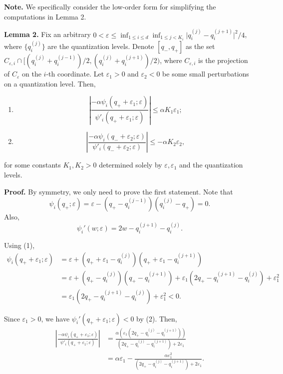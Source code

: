 \documentclass[10pt,a4paper]{article}
\begin{document}
\textbf{Note.} We specifically consider the low-order form for simplifying the computations in Lemma 2.

\textbf{Lemma 2.} Fix an arbitrary $0<\varepsilon\leq \inf_{1\leq i\leq d}\inf_{1\leq j<K_i} \lvert q_i^{(j)} - q_{i}^{(j+1)}\rvert^2/4$, where $\{q_i^{(j)}\}$ are the quantization levels. Denote $[q_-, q_+]$ as the set $C_{\varepsilon,i}\cap [(q_i^{(j)}+q_i^{(j-1)})/2, (q_i^{(j)}+q_i^{(j+1)})/2)$, where $C_{\varepsilon,i}$ is the projection of $C_\varepsilon$ on the $i$-th coordinate.
Let $\varepsilon_1>0$ and $\varepsilon_2<0$ be some small perturbations on a quantization level. Then,
\begin{enumerate}[label=(\alph*)]
  \item $$\left\lvert \frac{-\alpha\psi_i(q_++\varepsilon_1;\varepsilon)}{\psi'_i(q_++\varepsilon_1;\varepsilon)}\right\rvert \leq \alpha K_1\varepsilon_1;$$
  \item $$\left\lvert \frac{-\alpha\psi_i(q_-+\varepsilon_2;\varepsilon)}{\psi'_i(q_-+\varepsilon_2;\varepsilon)}\right\rvert \leq -\alpha K_2\varepsilon_2,$$
\end{enumerate}
for some constants $K_1, K_2>0$ determined solely by $\varepsilon, \varepsilon_1$ and the quantization levels.

\textbf{Proof.} By symmetry, we only need to prove the first statement. Note that \begin{equation}
  \psi_i(q_+;\varepsilon)=\varepsilon-(q_+-q_i^{(j-1)})(q_i^{(j)}-q_+)=0.
\end{equation}
Also, \begin{equation}
  \psi_i'(w;\varepsilon)=2w-q_i^{(j+1)}-q_i^{(j)}.
\end{equation}

Using (1),
$$\begin{aligned}
    \psi_i(q_++\varepsilon_1;\varepsilon) & =\varepsilon+(q_++\varepsilon_1-q_i^{(j)})(q_++\varepsilon_1-q_i^{(j+1)})                               \\
                                          & =\varepsilon+(q_+-q_i^{(j)})(q_+-q_i^{(j+1)})+\varepsilon_1(2q_+-q_i^{(j+1)}-q_i^{(j)})+\varepsilon_1^2 \\
                                          & =\varepsilon_1(2q_+-q_i^{(j+1)}-q_i^{(j)})+\varepsilon_1^2<0.
  \end{aligned}$$

Since $\varepsilon_1>0$, we have $\psi_i'(q_++\varepsilon_1;\varepsilon)<0$ by (2). Then,
$$\begin{aligned}\left\lvert \frac{-\alpha\psi_i(q_++\varepsilon_1;\varepsilon)}{\psi'_i(q_++\varepsilon_1;\varepsilon)}\right\rvert&=\frac{\alpha(\varepsilon_1(2q_+-q_i^{(j)}-q_i^{(j+1)}))}{(2q_+-q_i^{(j)}-q_i^{(j+1)})+2\varepsilon_1}\\&=\alpha\varepsilon_1-\frac{\alpha\varepsilon_1^2}{(2q_+-q_i^{(j)}-q_i^{(j+1)})+2\varepsilon_1}.\end{aligned}$$
\end{document}
